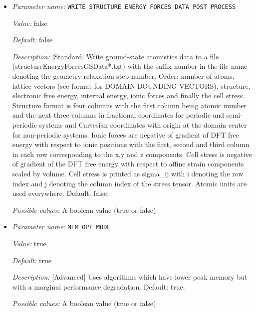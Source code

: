 \begin{itemize}
{\it Default:} false


{\it Description:} [Developer] Limit output to what is reproducible, i.e. don't print timing or absolute paths. This parameter is only used for testing purposes.


{\it Possible values:} A boolean value (true or false)
\item {\it Parameter name:} {\tt WRITE STRUCTURE ENERGY FORCES DATA POST PROCESS}
\label{parameters:WRITE STRUCTURE ENERGY FORCES DATA POST PROCESS}
\label{parameters:WRITE_20STRUCTURE_20ENERGY_20FORCES_20DATA_20POST_20PROCESS}


{\it Value:} false


{\it Default:} false


{\it Description:} [Standard] Write ground-state atomistics data to a file (structureEnergyForcesGSData*.txt) with the suffix number in the file-name denoting the geometry relaxation step number. Order: number of atoms, lattice vectors (see format for DOMAIN BOUNDING VECTORS), structure, electronic free energy, internal energy, ionic forces and finally the cell stress. Structure format is four columns with the first column being atomic number and the next three columns in fractional coordinates for periodic and semi-periodic systems and Cartesian coordinates with origin at the domain center for non-periodic systems. Ionic forces are negative of gradient of DFT free energy with respect to ionic positions with the first, second and third column in each row corresponding to the x,y and z components. Cell stress is negative of gradient of the DFT free energy with respect to affine strain components scaled by volume. Cell stress is printed as sigma\_{ij} with i denoting the row index and j denoting the column index of the stress tensor. Atomic units are used everywhere. Default: false.


{\it Possible values:} A boolean value (true or false)
\item {\it Parameter name:} {\tt MEM OPT MODE}
\label{parameters:MEM OPT MODE}
\label{parameters:MEM_20OPT_20MODE}


{\it Value:} true


{\it Default:} true


{\it Description:} [Advanced] Uses algorithms which have lower peak memory but with a marginal performance degradation. Default: true.


{\it Possible values:} A boolean value (true or false)
\end{itemize}



